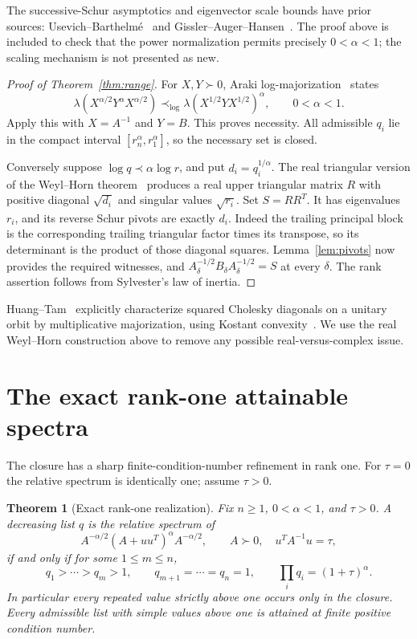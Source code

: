 \documentclass[11pt]{article}
\newtheorem{theorem}{Theorem}[section]
\begin{document}
The successive-Schur asymptotics and eigenvector scale bounds have prior
sources: Usevich--Barthelm\'e~\cite[Theorem 4.2 in the arXiv v2 PDF]{UB} and
Gissler--Auger--Hansen~\cite[Theorem 1]{GAH}. The proof above is included
to check that the power normalization permits precisely $0<\alpha<1$;
the scaling mechanism is not presented as new.

\begin{proof}[Proof of Theorem~\ref{thm:range}]
For $X,Y\succ0$, Araki log-majorization~\cite{Araki} states
\[
 \lambda(X^{\alpha/2}Y^\alpha X^{\alpha/2})
 \prec_{\log}
 \lambda(X^{1/2}YX^{1/2})^\alpha,
 \qquad0<\alpha<1.
\]
Apply this with $X=A^{-1}$ and $Y=B$. This proves necessity.
All admissible $q_i$ lie in the compact interval
$[r_n^\alpha,r_1^\alpha]$, so the necessary set is closed.

Conversely suppose $\log q\prec\alpha\log r$, and put
$d_i=q_i^{1/\alpha}$. The real triangular version of the
Weyl--Horn theorem~\cite{Horn,LiMathias} produces a real upper
triangular matrix $R$ with positive diagonal $\sqrt{d_i}$ and
singular values $\sqrt{r_i}$. Set $S=RR^T$.
It has eigenvalues $r_i$, and its reverse Schur pivots are exactly
$d_i$. Indeed the trailing principal block is the corresponding
trailing triangular factor times its transpose, so its determinant
is the product of those diagonal squares.
Lemma~\ref{lem:pivots} now provides the required witnesses, and
$A_\delta^{-1/2}B_\delta A_\delta^{-1/2}=S$ at every $\delta$.
The rank assertion follows from Sylvester's law of inertia.
\end{proof}

Huang--Tam~\cite[Theorem 3.3]{HT} explicitly characterize squared
Cholesky diagonals on a unitary orbit by multiplicative majorization,
using Kostant convexity~\cite{Kostant}. We use the real Weyl--Horn
construction above to remove any possible real-versus-complex issue.

\section{The exact rank-one attainable spectra}
The closure has a sharp finite-condition-number refinement in rank one.
For $\tau=0$ the relative spectrum is identically one; assume $\tau>0$.

\begin{theorem}[Exact rank-one realization]\label{thm:exact}
Fix $n\ge1$, $0<\alpha<1$, and $\tau>0$.
A decreasing list $q$ is the relative spectrum of
\[
 A^{-\alpha/2}(A+uu^T)^\alpha A^{-\alpha/2},
 \qquad A\succ0,\quad u^TA^{-1}u=\tau,
\]
if and only if for some $1\le m\le n$,
\[
 q_1>\cdots>q_m>1,\qquad
 q_{m+1}=\cdots=q_n=1,\qquad
 \prod_iq_i=(1+\tau)^\alpha.
\]
In particular every repeated value strictly above one occurs only in
the closure. Every admissible list with simple values above one is
attained at finite positive condition number.
\end{theorem}
\end{document}
